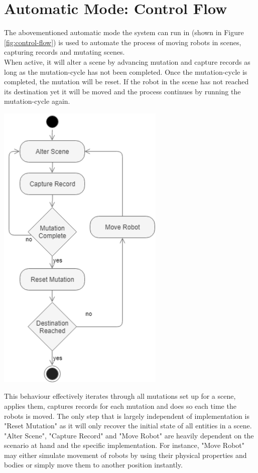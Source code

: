 \section{Automatic Mode: Control Flow}
The abovementioned automatic mode the system can run in (shown in Figure \ref{fig:control-flow}) is used to automate the process of moving robots in scenes, capturing records and mutating scenes.\\
When active, it will alter a scene by advancing mutation and capture records as long as the mutation-cycle has not been completed. Once the mutation-cycle is completed, the mutation will be reset. If the robot in the scene has not reached its destination yet it will be moved and the process continues by running the mutation-cycle again.\\
\label{ch04-control-flow}
\begin{center}
    \noindent\includegraphics[width=8cm]{tex/img/ch04/ActivityDiagram_HighLevel01.png}
    \label{fig:control-flow}
\end{center}
This behaviour effectively iterates through all mutations set up for a scene, applies them, captures records for each mutation and does so each time the robots is moved. The only step that is largely independent of implementation is "Reset Mutation" as it will only recover the initial state of all entities in a scene. "Alter Scene", "Capture Record" and "Move Robot" are heavily dependent on the scenario at hand and the specific implementation. For instance, "Move Robot" may either simulate movement of robots by using their physical properties and bodies or simply move them to another position instantly.

